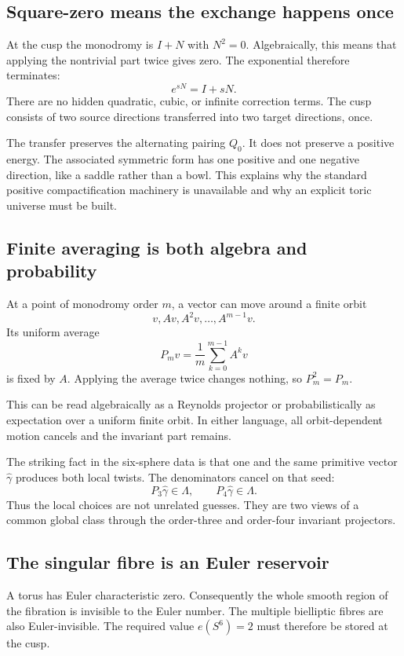 \documentclass[11pt,reqno]{amsart}
\numberwithin{equation}{section}
\newcommand{\wideg}{\widehat\gamma}
\theoremstyle{definition}
\begin{document}
\subsection{Square-zero means the exchange happens once}

At the cusp the monodromy is $I+N$ with $N^2=0$. Algebraically, this means that applying the nontrivial part twice gives zero. The exponential therefore terminates:
\[
e^{sN}=I+sN.
\]
There are no hidden quadratic, cubic, or infinite correction terms. The cusp consists of two source directions transferred into two target directions, once.

The transfer preserves the alternating pairing $Q_0$. It does not preserve a positive energy. The associated symmetric form has one positive and one negative direction, like a saddle rather than a bowl. This explains why the standard positive compactification machinery is unavailable and why an explicit toric universe must be built.

\subsection{Finite averaging is both algebra and probability}

At a point of monodromy order $m$, a vector can move around a finite orbit
\[
v,Av,A^2v,\ldots,A^{m-1}v.
\]
Its uniform average
\[
P_mv=\frac1m\sum_{k=0}^{m-1}A^kv
\]
is fixed by $A$. Applying the average twice changes nothing, so $P_m^2=P_m$.

This can be read algebraically as a Reynolds projector or probabilistically as expectation over a uniform finite orbit. In either language, all orbit-dependent motion cancels and the invariant part remains.

The striking fact in the six-sphere data is that one and the same primitive vector $\wideg$ produces both local twists. The denominators cancel on that seed:
\[
P_3\wideg\in\Lambda,
\qquad
P_4\wideg\in\Lambda.
\]
Thus the local choices are not unrelated guesses. They are two views of a common global class through the order-three and order-four invariant projectors.

\subsection{The singular fibre is an Euler reservoir}

A torus has Euler characteristic zero. Consequently the whole smooth region of the fibration is invisible to the Euler number. The multiple bielliptic fibres are also Euler-invisible. The required value $e(S^6)=2$ must therefore be stored at the cusp.
\end{document}
